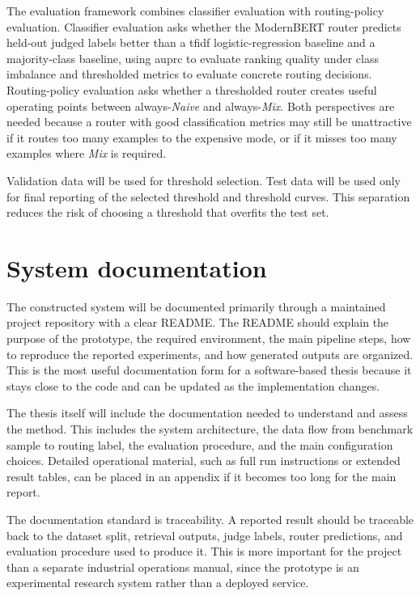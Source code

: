 \documentclass[english, bibtex]{kththesis}               %
\numberwithin{listing}{chapter}
\begin{document}
The evaluation framework combines classifier evaluation with routing-policy evaluation. Classifier evaluation asks whether the ModernBERT router predicts held-out judged labels better than a \gls{tfidf} logistic-regression baseline and a majority-class baseline, using \gls{auprc} to evaluate ranking quality under class imbalance and thresholded metrics to evaluate concrete routing decisions. Routing-policy evaluation asks whether a thresholded router creates useful operating points between always-\emph{Naive} and always-\emph{Mix}. Both perspectives are needed because a router with good classification metrics may still be unattractive if it routes too many examples to the expensive mode, or if it misses too many examples where \emph{Mix} is required.

Validation data will be used for threshold selection. Test data will be used only for final reporting of the selected threshold and threshold curves. This separation reduces the risk of choosing a threshold that overfits the test set.

\section{System documentation}
\label{sec:systemDocumentation}

The constructed system will be documented primarily through a maintained project repository with a clear README. The README should explain the purpose of the prototype, the required environment, the main pipeline steps, how to reproduce the reported experiments, and how generated outputs are organized. This is the most useful documentation form for a software-based thesis because it stays close to the code and can be updated as the implementation changes.

The thesis itself will include the documentation needed to understand and assess the method. This includes the system architecture, the data flow from benchmark sample to routing label, the evaluation procedure, and the main configuration choices. Detailed operational material, such as full run instructions or extended result tables, can be placed in an appendix if it becomes too long for the main report.

The documentation standard is traceability. A reported result should be traceable back to the dataset split, retrieval outputs, judge labels, router predictions, and evaluation procedure used to produce it. This is more important for the project than a separate industrial operations manual, since the prototype is an experimental research system rather than a deployed service.
\end{document}
